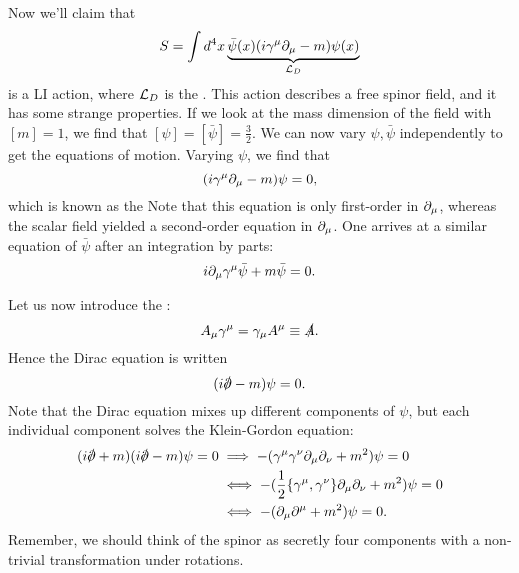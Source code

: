 Now we'll claim that
$$S=\int d^4x \underbrace{\bar \psi(x)(i \gamma^\mu \partial_\mu -m)\psi(x)}_{\mathcal L_D}$$
is a LI action, where $\mathcal L_D$ is the . This action describes a free spinor field, and it has some strange properties. If we look at the mass dimension of the field with $[m]=1$, we find that $[\psi]=[\bar\psi]=\frac{3}{2}$. We can now vary $\psi,\bar\psi$ independently to get the equations of motion. Varying $\psi$, we find that
$$(i\gamma^\mu \partial_\mu -m)\psi=0,$$
which is known as the  Note that this equation is only first-order in $\partial_\mu$, whereas the scalar field yielded a second-order equation in $\partial_\mu$. One arrives at a similar equation of $\bar \psi$ after an integration by parts:
$$i\partial_\mu \gamma^\mu \bar \psi + m \bar \psi=0.$$

Let us now introduce the :
$$A_\mu \gamma^\mu = \gamma_\mu A^\mu \equiv \slashed{A}.$$
Hence the Dirac equation is written
$$(i\slashed{\p}-m)\psi=0.$$
Note that the Dirac equation mixes up different components of $\psi$, but each individual component solves the Klein-Gordon equation:
\begin{align*}
    (i\slashed{\p}+m)(i\slashed{\p}-m)\psi=0
    &\implies -(\gamma^\mu \gamma^\nu \p_\mu \p_\nu +m^2)\psi=0\\
    &\iff -(\frac{1}{2}\set{\gamma^\mu, \gamma^\nu}\p_\mu \p_\nu +m^2)\psi =0\\
    &\iff -(\p_\mu \p^\mu+m^2)\psi =0.
\end{align*}
Remember, we should think of the spinor as secretly four components with a non-trivial transformation under rotations.

